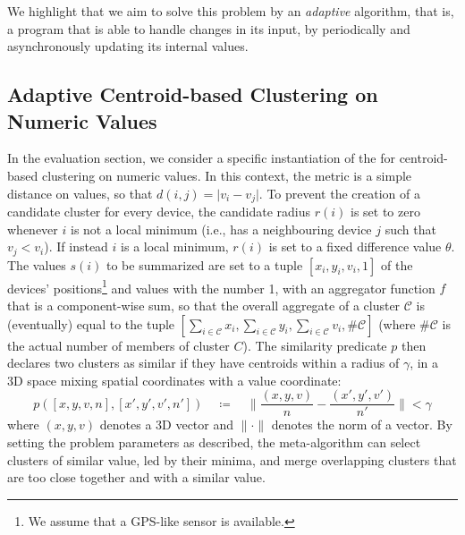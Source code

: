 %
We highlight that we aim to solve this problem by an \emph{adaptive} algorithm,
 that is, a program that is able to handle changes in its input, by periodically and asynchronously updating its internal values.

\subsection{Adaptive Centroid-based Clustering on Numeric Values} \label{ssec:instantiation}

In the evaluation section, we consider a specific instantiation of the 
 for centroid-based clustering on numeric values.
 In this context, the metric is a simple distance on values, so that $d(i, j) = \lvert v_i - v_j \rvert$.
 To prevent the creation of a candidate cluster for every device, 
 the candidate radius $r(i)$ is set to zero whenever $i$ is not a local minimum
 (i.e., has a neighbouring device $j$ such that $v_j < v_i$). 
 If instead $i$ is a local minimum, $r(i)$ is set to a fixed difference value $\theta$.
 The values $s(i)$ to be summarized are set to a tuple $[x_i, y_i, v_i, 1]$ of the devices' positions\footnote{We assume that a GPS-like sensor is available.} and values with the number 1,
 with an aggregator function $f$ that is a component-wise sum, so that the overall aggregate of a cluster $\mathcal{C}$ is (eventually) equal to the tuple
 $[\sum_{i \in \mathcal{C}} x_i, \sum_{i \in \mathcal{C}} y_i, \sum_{i \in \mathcal{C}} v_i, \#\mathcal{C}]$ (where $\#\mathcal{C}$ is the actual number of members of cluster $C$).
 The similarity predicate $p$ then declares two clusters as similar if they have centroids within a radius of $\gamma$,
 in a 3D space mixing spatial coordinates with a value coordinate:
\[
p([x, y, v, n], [x', y', v', n']) \quad\coloneqq\quad \lVert \frac{(x,y,v)}{n} - \frac{(x',y',v')}{n'} \rVert < \gamma
\]
where $(x,y,v)$ denotes a 3D vector and $\lVert \cdot \rVert$ denotes the norm of a vector.
 By setting the problem parameters as described, the meta-algorithm can select clusters of similar value,
 led by their minima, and merge overlapping clusters that are too close together and with a similar value.

